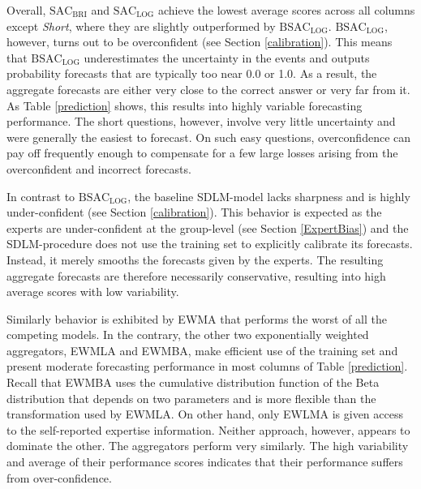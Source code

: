 \documentclass[aoas, preprint]{imsart}
\numberwithin{equation}{section}
\theoremstyle{plain}
\begin{document}
Overall, $\text{SAC}_{\text{BRI}}$ and $\text{SAC}_{\text{LOG}}$ achieve the lowest average scores across all columns except \textit{Short}, where they are slightly outperformed by $\text{BSAC}_{\text{LOG}}$.  $\text{BSAC}_{\text{LOG}}$, however, turns out to be overconfident (see Section \ref{calibration}). This means that $\text{BSAC}_{\text{LOG}}$ underestimates the uncertainty in the events and outputs probability forecasts that are typically too near 0.0 or 1.0. As a result, the aggregate forecasts are either very close to the correct answer or very far from it.  As Table \ref{prediction} shows, this results into highly variable forecasting performance. The short questions, however, involve very little uncertainty and were generally the easiest to forecast. On such easy questions, overconfidence can pay off frequently enough to compensate for a few large losses arising from the overconfident and incorrect forecasts. 

In contrast to $\text{BSAC}_{\text{LOG}}$, the baseline SDLM-model lacks sharpness and is highly under-confident (see Section \ref{calibration}). This behavior is expected as the experts are under-confident at the group-level (see Section \ref{ExpertBias}) and the SDLM-procedure does not use the training set to explicitly calibrate its forecasts. Instead, it merely smooths the forecasts given by the experts. The resulting aggregate forecasts are therefore necessarily conservative, resulting into high average scores with low variability. 

 Similarly behavior is exhibited by EWMA that performs the worst of all the competing models. In the contrary, the other two exponentially weighted aggregators, EWMLA and EWMBA, make efficient use of the training set and present moderate forecasting performance in most columns of Table \ref{prediction}. Recall that EWMBA uses the cumulative distribution function of the Beta distribution that depends on two parameters and is more flexible than the transformation used by EWMLA. On other hand, only EWLMA is given access to the self-reported expertise information. Neither approach, however, appears to dominate the other. The aggregators perform very similarly. The high variability and average of their performance scores indicates that their performance suffers from over-confidence.


\end{document}
